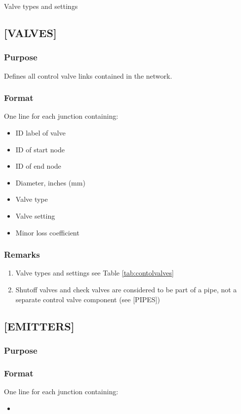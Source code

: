 \begin{table}[tbp]
  
  \caption{Valve types and settings}
  \label{tab:contolvalves}
\end{table}



\subsection{[VALVES]}
  \subsubsection{Purpose}
  Defines all control valve links contained in the network.
  \subsubsection{Format}
  One line for each junction containing:
  \begin{itemize}
    \item ID label of valve
    \item ID of start node
    \item ID of end node
    \item Diameter, inches (mm)
    \item Valve type
    \item Valve setting
    \item Minor loss coefficient
  \end{itemize}
  \subsubsection{Remarks}
  \begin{enumerate}
    \item Valve types and settings see Table \ref{tab:contolvalves}
    \item Shutoff valves and check valves are considered to be part of a pipe,
          not a separate control valve component (see [PIPES])
  \end{enumerate}


\subsection{[EMITTERS]}
  \subsubsection{Purpose}
  \subsubsection{Format}
  One line for each junction containing:
  \begin{itemize}
    \item
  \end{itemize}


  
